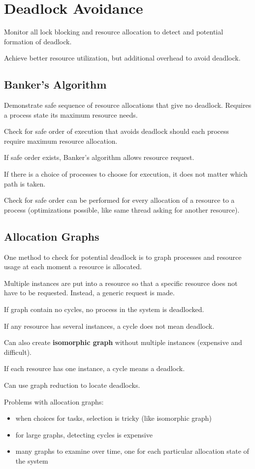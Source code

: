 \documentclass[11pt]{article}
\begin{document}
\section{Deadlock Avoidance}
\label{sec:org2ed5b82}
Monitor all lock blocking and resource allocation to detect and potential formation of deadlock.

Achieve better resource utilization, but additional overhead to avoid deadlock.
\subsection{Banker's Algorithm}
\label{sec:org449f154}
Demonstrate safe sequence of resource allocations that give no deadlock.
Requires a process state its maximum resource needs.

Check for safe order of execution that avoids deadlock should each process require maximum
resource allocation.

If safe order exists, Banker's algorithm allows resource request.

If there is a choice of processes to choose for execution, it does not matter which path is
taken.

Check for safe order can be performed for every allocation of a resource to a process
(optimizations possible, like same thread asking for another resource).
\subsection{Allocation Graphs}
\label{sec:org589629a}
One method to check for potential deadlock is to graph processes and resource usage at each
moment a resource is allocated.

Multiple instances are put into a resource so that a specific resource does not have to be requested.
Instead, a generic request is made.

If graph contain no cycles, no process in the system is deadlocked.

If any resource has several instances, a cycle does not mean deadlock.

Can also create \textbf{isomorphic graph} without multiple instances (expensive and difficult).

If each resource has one instance, a cycle means a deadlock.

Can use graph reduction to locate deadlocks.

Problems with allocation graphs:
\begin{itemize}
\item when choices for tasks, selection is tricky (like isomorphic graph)
\item for large graphs, detecting cycles is expensive
\item many graphs to examine over time, one for each particular allocation state of the system
\end{itemize}
\end{document}
